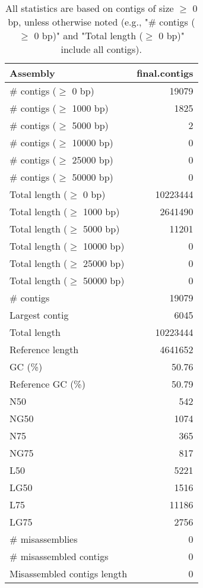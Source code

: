 \documentclass[12pt,a4paper]{article}
\begin{document}
\begin{table}[ht]
\begin{center}
\caption{All statistics are based on contigs of size $\geq$ 0 bp, unless otherwise noted (e.g., "\# contigs ($\geq$ 0 bp)" and "Total length ($\geq$ 0 bp)" include all contigs).}
\begin{tabular}{|l*{1}{|r}|}
\hline
Assembly & final.contigs \\ \hline
\# contigs ($\geq$ 0 bp) & 19079 \\ \hline
\# contigs ($\geq$ 1000 bp) & 1825 \\ \hline
\# contigs ($\geq$ 5000 bp) & 2 \\ \hline
\# contigs ($\geq$ 10000 bp) & 0 \\ \hline
\# contigs ($\geq$ 25000 bp) & 0 \\ \hline
\# contigs ($\geq$ 50000 bp) & 0 \\ \hline
Total length ($\geq$ 0 bp) & 10223444 \\ \hline
Total length ($\geq$ 1000 bp) & 2641490 \\ \hline
Total length ($\geq$ 5000 bp) & 11201 \\ \hline
Total length ($\geq$ 10000 bp) & 0 \\ \hline
Total length ($\geq$ 25000 bp) & 0 \\ \hline
Total length ($\geq$ 50000 bp) & 0 \\ \hline
\# contigs & 19079 \\ \hline
Largest contig & 6045 \\ \hline
Total length & 10223444 \\ \hline
Reference length & 4641652 \\ \hline
GC (\%) & 50.76 \\ \hline
Reference GC (\%) & 50.79 \\ \hline
N50 & 542 \\ \hline
NG50 & 1074 \\ \hline
N75 & 365 \\ \hline
NG75 & 817 \\ \hline
L50 & 5221 \\ \hline
LG50 & 1516 \\ \hline
L75 & 11186 \\ \hline
LG75 & 2756 \\ \hline
\# misassemblies & 0 \\ \hline
\# misassembled contigs & 0 \\ \hline
Misassembled contigs length & 0 \\ \hline

\end{tabular}
\end{center}
\end{table}
\end{document}
